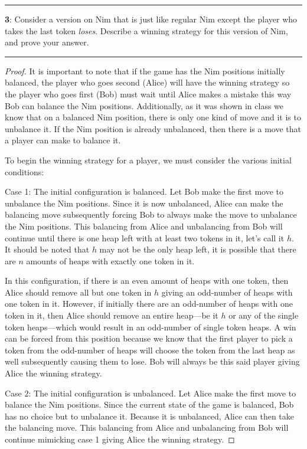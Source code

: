 \documentclass[11pt]{article}
\newcommand\question[2]{\vspace{.25in}\hrule\textbf{#1}: #2\vspace{.5em}\hrule\vspace{.10in}}
\begin{document}
\question{3}{Consider a version on Nim that is just like regular Nim except the player who takes the last token \textit{loses}. Describe a winning strategy for this version of Nim, and prove your answer.}
\begin{proof}
	It is important to note that if the game has the Nim positions initially balanced, the player who goes second (Alice) will have the winning strategy so the player who goes first (Bob) must wait until Alice makes a mistake this way Bob can balance the Nim positions. Additionally, as it was shown in class we know that on a balanced Nim position, there is only one kind of move and it is to unbalance it. If the Nim position is already unbalanced, then there is a move that a player can make to balance it.

	To begin the winning strategy for a player, we must consider the various initial conditions:

	Case 1: The initial configuration is balanced. Let Bob make the first move to unbalance the Nim positions. Since it is now unbalanced, Alice can make the balancing move subsequently forcing Bob to always make the move to unbalance the Nim positions. This balancing from Alice and unbalancing from Bob will continue until there is one heap left with at least two tokens in it, let's call it $h$. It should be noted that $h$ may not be the only heap left, it is possible that there are $n$ amounts of heaps with exactly one token in it.

	In this configuration, if there is an even amount of heaps with one token, then Alice should remove all but one token in $h$ giving an odd-number of heaps with one token in it. However, if initially there are an odd-number of heaps with one token in it, then Alice should remove an entire heap—be it $h$ or any of the single token heaps—which would result in an odd-number of single token heaps. A win can be forced from this position because we know that the first player to pick a token from the odd-number of heaps will choose the token from the last heap as well subsequently causing them to lose. Bob will always be this said player giving Alice the winning strategy. 

	Case 2: The initial configuration is unbalanced. Let Alice make the first move to balance the Nim positions. Since the current state of the game is balanced, Bob has no choice but to unbalance it. Because it is unbalanced, Alice can then take the balancing move. This balancing from Alice and unbalancing from Bob will continue mimicking case 1 giving Alice the winning strategy. 
\end{proof}





	
\end{document}
